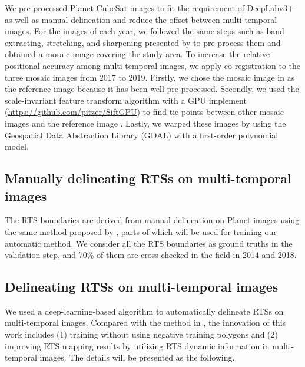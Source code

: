 \documentclass[authoryear,preprint,review,12pt]{elsarticle}
\begin{document}
We pre-processed Planet CubeSat images to fit the requirement of DeepLabv3+ as well as manual delineation and reduce the offset between multi-temporal images. 
For the images of each year, we followed the same steps such as band extracting, stretching, and sharpening presented by \cite{huang2020using} to pre-process them and obtained a mosaic image covering the study area. 
To increase the relative positional accuracy among multi-temporal images, we apply co-registration to the three mosaic images from 2017 to 2019. 
Firstly, we chose the mosaic image in \cite{huang2020using} as the reference image because it has been well pre-processed. 
Secondly, we used the scale-invariant feature transform algorithm \citep{lowe2004distinctive} with a GPU implement (\url{https://github.com/pitzer/SiftGPU}) to find tie-points between other mosaic images and the reference image \citep{huang2016a}. 
Lastly, we warped these images by using the Geospatial Data Abstraction Library (GDAL) with a first-order polynomial model.


\subsection{Manually delineating RTSs on multi-temporal images}
\label{sec_manu_delineating}

The RTS boundaries are derived from manual delineation on Planet images using the same method proposed by \cite{huang2020using}, parts of which will be used for training our automatic method. 
We consider all the RTS boundaries as ground truths in the validation step, and 70\% of them are cross-checked in the field in 2014 and 2018. %




\subsection{Delineating RTSs on multi-temporal images}
\label{sec_delineating}

We used a deep-learning-based algorithm \citep{huang2020using} to automatically delineate RTSs on multi-temporal images.
Compared with the method in \cite{huang2020using},  the innovation of this work includes (1) training without using negative training polygons and (2) improving RTS mapping results by utilizing RTS dynamic information in multi-temporal images. 
The details will be presented as the following.
\end{document}
